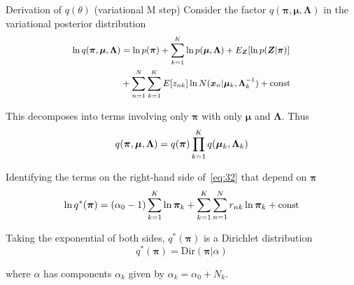 \documentclass[10pt,mathserif]{beamer}
\begin{document}
\begin{frame}{Derivation of $q(\theta)$ (variational M step)}
Consider the factor $q(\bm{\pi}, \bm{\mu}, \bm{\Lambda})$ in the variational posterior distribution
\begin{equation}\small\label{eq:32}
    \begin{split}
        \ln q(\bm{\pi}, \bm{\mu}, \bm{\Lambda}) & = \ln p(\bm{\pi}) + \sum_{k=1}^K\ln p(\bm{\mu}, \bm{\Lambda}) + E_{\bm{Z}}[\ln p(\bm{Z}|\bm{\pi})] \\ 
        & + \sum_{n=1}^N \sum_{k=1}^K E[z_{nk}] \ln N(\bm{x}_n|\bm{\mu}_k, \bm{\Lambda}_k^{-1}) + \text{const}
    \end{split}
\end{equation}

This decomposes into terms involving only $\bm{\pi}$ with only $\bm{\mu}$ and $\bm{\Lambda}$. Thus
\begin{equation}\small\label{eq:33}
    q(\bm{\pi}, \bm{\mu}, \bm{\Lambda}) = q(\bm{\pi}) \prod_{k=1}^K q(\bm{\mu}_k,\bm{\Lambda}_k)
\end{equation}

Identifying the terms on the right-hand side of~\eqref{eq:32} that depend on $\bm{\pi}$
\begin{equation}\small
    \ln q^* (\bm{\pi}) = (\alpha_0 -1) \sum_{k=1}^K \ln \bm{\pi}_k + \sum_{k=1}^K\sum_{n=1}^N r_{nk}\ln\bm{\pi}_k +\text{const} 
\end{equation}

Taking the exponential of both sides, $q^* (\bm{\pi})$ is a Dirichlet distribution
\begin{equation}
    q^*(\bm{\pi}) = \text{Dir}(\bm{\pi}|\alpha)
\end{equation}

where $\alpha$ has components $\alpha_k$ given by $\alpha_k = \alpha_0 + N_k$.
\end{frame}
\end{document}
